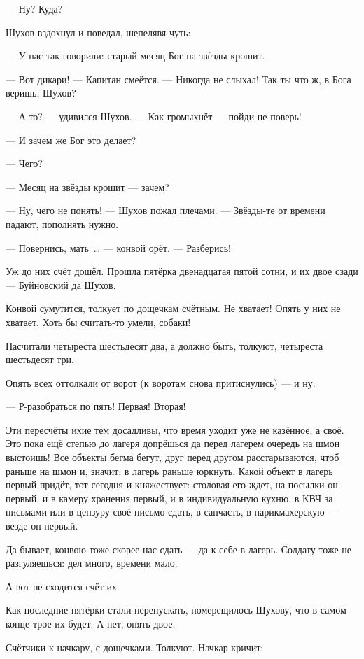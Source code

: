 --- Ну? Куда?

Шухов вздохнул и поведал, шепелявя чуть:

--- У нас так говорили: старый месяц Бог на звёзды крошит.

--- Вот дикари! --- Капитан смеётся. --- Никогда не слыхал! Так ты что ж, в Бога веришь, Шухов?

--- А то? --- удивился Шухов. --- Как громыхнёт --- пойди не поверь!

--- И зачем же Бог это делает?

--- Чего?

--- Месяц на звёзды крошит --- зачем?

--- Ну, чего не понять! --- Шухов пожал плечами. --- Звёзды-те от времени падают, пополнять нужно.

--- Повернись, мать~\dots{} --- конвой орёт. --- Разберись!

Уж до них счёт дошёл. Прошла пятёрка двенадцатая пятой сотни, и их двое сзади --- Буйновский да Шухов.

Конвой сумутится, толкует по дощечкам счётным. Не хватает! Опять у них не хватает. Хоть бы считать-то умели, собаки!

Насчитали четыреста шестьдесят два, а должно быть, толкуют, четыреста шестьдесят три.

Опять всех оттолкали от ворот (к воротам снова притиснулись) --- и ну:

--- Р-разобраться по пять! Первая! Вторая!

Эти пересчёты ихие тем досадливы, что время уходит уже не казённое, а своё. Это пока ещё степью до лагеря допрёшься да перед лагерем очередь на шмон выстоишь! Все объекты бегма бегут, друг перед другом расстарываются, чтоб раньше на шмон и, значит, в лагерь раньше юркнуть. Какой объект в лагерь первый придёт, тот сегодня и княжествует: столовая его ждет, на посылки он первый, и в камеру хранения первый, и в индивидуальную кухню, в КВЧ за письмами или в цензуру своё письмо сдать, в санчасть, в парикмахерскую --- везде он первый.

Да бывает, конвою тоже скорее нас сдать --- да к себе в лагерь. Солдату тоже не разгуляешься: дел много, времени мало.

А вот не сходится счёт их.

Как последние пятёрки стали перепускать, померещилось Шухову, что в самом конце трое их будет. А нет, опять двое.

Счётчики к начкару, с дощечками. Толкуют. Начкар кричит:


